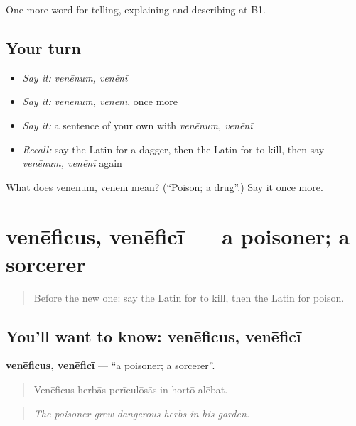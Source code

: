\begin{grammarlens}[title={What you've built}]
One more word for telling, explaining and describing at B1.
\end{grammarlens}

\subsection*{Your turn}
\begin{itemize}
\raggedright
  \item \emph{Say it:} \emph{venēnum, venēnī}
  \item \emph{Say it:} \emph{venēnum, venēnī}, once more
  \item \emph{Say it:} a sentence of your own with \emph{venēnum, venēnī}
  \item \emph{Recall:} say the Latin for a dagger, then the Latin for to kill, then say \emph{venēnum, venēnī} again
\end{itemize}

\begin{tcolorbox}[breakable,colback=teal!4,colframe=teal!35!black,title={Before you move on}]
What does venēnum, venēnī mean? (\textquotedblleft{}Poison; a drug\textquotedblright{}.) Say it once more.
\end{tcolorbox}
\section[venēficus, venēficī]{venēficus, venēficī — a poisoner; a sorcerer}

\label{lesson:LA-C307-veneficus}



\begin{quote}
Before the new one: say the Latin for to kill, then the Latin for poison.
\end{quote}

\subsection*{You'll want to know: venēficus, venēficī}
\textbf{venēficus, venēficī} — \textquotedblleft{}a poisoner; a sorcerer\textquotedblright{}.

\begin{quote}
Venēficus herbās perīculōsās in hortō alēbat.
\end{quote}

\begin{quote}
\emph{The poisoner grew dangerous herbs in his garden.}
\end{quote}

